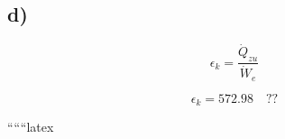

\subsection*{d)}

\[
\epsilon_k = \frac{\dot{Q}_{zu}}{\dot{W}_e}
\]

\[
\epsilon_k = 572.98 \quad ??
\]

``````latex